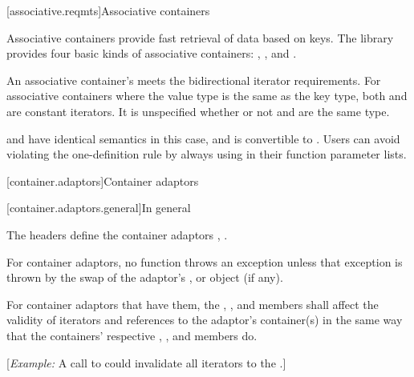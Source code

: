 \setcounter{subsection}{5}

\noindent\makebox[\linewidth]{\rule{\textwidth}{0.4pt}}

[associative.reqmts]{Associative containers}

\pnum
Associative containers provide fast retrieval of data based on keys.
The library provides four basic kinds of associative containers:
,
,
and
.

\noindent\makebox[\linewidth]{\rule{\textwidth}{0.4pt}}

\setcounter{Paras}{5}
\pnum
{}
{An associative container's  meets the bidirectional iterator requirements.}
For associative containers where the value type is the same as the key type, both
and
are constant iterators. It is unspecified whether or not
and
are the same type.
\begin{note}  and  have identical semantics in this case, and  is convertible to . Users can avoid violating the one-definition rule by always using  in their function parameter lists. \end{note}

\setcounter{chapter}{21}
\setcounter{section}{5}
[container.adaptors]{Container adaptors}

[container.adaptors.general]{In general}

 \pnum
The headers   define the container adaptors ,
 .

\pnum
For container adaptors, no  function throws an exception unless
that exception is thrown by the swap of the
adaptor's , or
 object (if any).

\begin{addedblock}
\pnum
For container adaptors that have them, the , ,
and  members shall affect the validity of iterators and
references to the adaptor's container(s) in the same way that the containers'
respective , , and  members do.

[\textit{Example:} A call to  could invalidate all iterators to
the .]
\end{addedblock}

